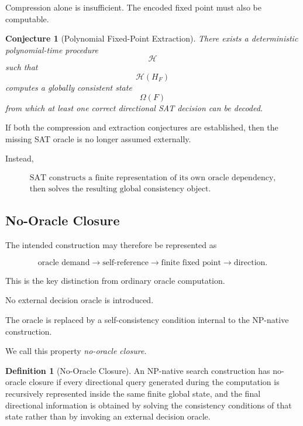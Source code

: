 \documentclass[11pt]{article}
\theoremstyle{plain}
\newtheorem{conjecture}[theorem]{Conjecture}
\theoremstyle{definition}
\newtheorem{definition}[theorem]{Definition}
\begin{document}
Compression alone is insufficient.  The encoded fixed point must also be
computable.

\begin{conjecture}[Polynomial Fixed-Point Extraction]
\label{conj:polynomial-fixed-point}
There exists a deterministic polynomial-time procedure
\[
    \mathcal{H}
\]
such that
\[
    \mathcal{H}(H_F)
\]
computes a globally consistent state
\[
    \Omega(F)
\]
from which at least one correct directional SAT decision can be decoded.
\end{conjecture}

If both the compression and extraction conjectures are established, then the
missing SAT oracle is no longer assumed externally.

Instead,

\[
\boxed{\begin{gathered}
\text{SAT constructs a finite representation of its own oracle dependency,}\\
\text{then solves the resulting global consistency object.}
\end{gathered}}
\]

\subsection{No-Oracle Closure}

The intended construction may therefore be represented as

\[
    \boxed{
    \text{oracle demand}
    \rightarrow
    \text{self-reference}
    \rightarrow
    \text{finite fixed point}
    \rightarrow
    \text{direction}.
    }
\]

This is the key distinction from ordinary oracle computation.

No external decision oracle is introduced.

The oracle is replaced by a self-consistency condition internal to the
NP-native construction.

We call this property \emph{no-oracle closure}.

\begin{definition}[No-Oracle Closure]
\label{def:no-oracle-closure}
An NP-native search construction has no-oracle closure if every directional
query generated during the computation is recursively represented inside the
same finite global state, and the final directional information is obtained by
solving the consistency conditions of that state rather than by invoking an
external decision oracle.
\end{definition}
\end{document}
